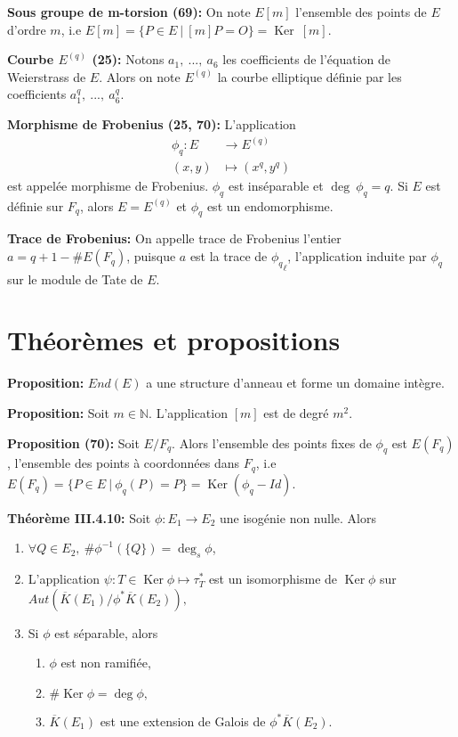 \documentclass[a4paper,11pt]{article}
\DeclareMathOperator{\Ker}{Ker}
\begin{document}
\textbf{Sous groupe de m-torsion (69):} On note $E[m]$ l'ensemble des points de $E$ d'ordre $m$, i.e
  $E[m] = \{P \in E ~|~ [m]P = O\} = \Ker~ [m]$.
\vspace{5mm}

\textbf{Courbe $E^{(q)}$ (25):} Notons $a_1,~ ...,~ a_6$ les coefficients de l’équation de Weierstrass de $E$. 
  Alors on note $E^{(q)}$ la courbe elliptique définie par les coefficients $a_1^q,~ ...,~ a_6^q$.
\vspace{5mm}

\textbf{Morphisme de Frobenius (25, 70):} L'application 
  \begin{align*}
    \phi_q: E &\to E^{(q)}\\
    (x, y) &\mapsto (x^q, y^q)
  \end{align*}
  est appelée morphisme de Frobenius. $\phi_q$ est inséparable et $\deg~ \phi_q = q$.
  Si $E$ est définie sur $F_q$, alors $E = E^{(q)}$ et $\phi_q$ est un endomorphisme.
\vspace{5mm}

\textbf{Trace de Frobenius:} On appelle trace de Frobenius l'entier $a = q + 1 - \#E(F_q)$, puisque $a$
est la trace de ${\phi_q}_\ell$, l'application induite par $\phi_q$ sur le module de Tate de $E$.

\section{Théorèmes et propositions}

\textbf{Proposition:} $End(E)$ a une structure d'anneau et forme un domaine intègre.
\vspace{5mm}

\textbf{Proposition:} Soit $m \in \mathbb{N}$. L'application $[m]$ est de degré $m^2$.
\vspace{5mm}

\textbf{Proposition (70):} Soit $E/F_q$. Alors l'ensemble des points fixes de $\phi_q$ est $E(F_q)$,
l'ensemble des points à coordonnées dans $F_q$, i.e $E(F_q) = \{P \in E ~|~ \phi_q(P) = P\} = \Ker (\phi_q - Id).$
\vspace{1mm}

\textbf{Théorème III.4.10:} Soit $\phi: E_1 \to E_2$ une isogénie non nulle. Alors
\begin{enumerate}
	\item $\forall Q \in E_2,~ \#\phi^{-1}(\{Q\}) = \deg_s \phi$,
	\item L'application $\psi: T \in \Ker \phi \mapsto \tau_T^*$ est un isomorphisme de $\Ker \phi$ sur \newline
		$Aut(\overline{K}(E_1)/\phi^*\overline{K}(E_2)),$
	\item Si $\phi$ est séparable, alors
		\begin{enumerate}
			\item $\phi$ est non ramifiée,
			\item $\#\Ker \phi = \deg \phi,$
			\item $\overline{K}(E_1)$ est une extension de Galois de $\phi^*\overline{K}(E_2).$
		\end{enumerate}
\end{enumerate}
\vspace{5mm}
\end{document}
